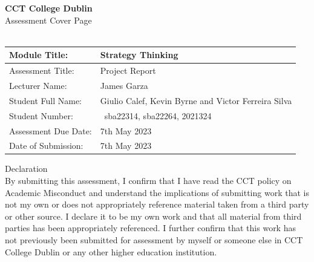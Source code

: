 \documentclass{article}
\begin{document}
\begin{titlepage}
    \begin{center}
        \vspace*{1cm}
        \LARGE\textbf{CCT College Dublin}\\
        \vspace{0.5cm}
        \Large Assessment Cover Page\\
        \hrulefill\\
        \vspace{1cm}
        \begin{tabular}{|l|p{7cm}|}
        
        \hline
        Module Title:& Strategy Thinking \\
        \hline
        Assessment Title:& Project Report\\
        \hline
        Lecturer Name:& James Garza\\
        \hline
        Student Full Name:& Giulio Calef, Kevin Byrne and Victor Ferreira Silva \\
        \hline
        Student Number:& sba22314, sba22264, 2021324 \\
        \hline
        Assessment Due Date:& 7th May 2023\\
        \hline
        Date of Submission:& 7th May 2023\\
        \hline
        \end{tabular}
        
        \vspace{1cm}
        \Large Declaration\\
        \vspace{0.5cm}
        \normalsize By submitting this assessment, I confirm that I have read the CCT policy on Academic Misconduct and understand the implications of submitting work that is not my own or does not appropriately reference material taken from a third party or other source. I declare it to be my own work and that all material from third parties has been appropriately referenced. I further confirm that this work has not previously been submitted for assessment by myself or someone else in CCT College Dublin or any other higher education institution.\\
    \end{center}
\end{titlepage}
\end{document}

